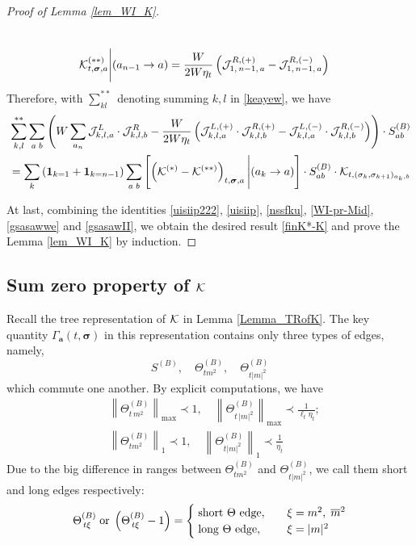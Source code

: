 \documentclass[10pt,reqno]{article}
\theoremstyle{plain} %
\theoremstyle{remark}
\numberwithin{equation}{section}
\begin{document}
\begin{proof}[Proof of Lemma \ref{lem_WI_K}]
\begin{itemize}
\begin{align}
      \\\nonumber
       {\cal K}^{(**)}_{t, \boldsymbol{\sigma}, \textbf{a}}\Bigg|(a_{n-1}\to a) 
      & = \frac{W}{2W\eta_t}
      \left({\cal J}^{R, (+)}_{1,\,n-1,\,a}-{\cal J}^{R, (-)}_{1,\,n-1,\,a}\right)
  \end{align}
  Therefore, with $\sum_{kl}^{**}$ denoting  summing  $k,l$ in \eqref{keayew}, we have  
  \begin{align}\label{uisiip222}
    &\sum_{k,l}^{**}  \sum_{a\;b}
    \left( {W}\sum_{a_n} 
        {\cal J}^{L}_{k,l,a}\cdot{\cal J}^{R}_{k,l,b}
        -\frac{W}{2W\eta_t} 
        \left(
        {\cal J}^{L,(+)}_{k,l,a}\cdot{\cal J}^{R,(+)}_{k,l,b}
        -
        {\cal J}^{L,(-)}_{k,l,a}\cdot{\cal J}^{R,(-)}_{k,l,b}
        \right)
        \right)\cdot S^{(B)}_{ab} 
        \\\nonumber
       &=\sum_{k}\left({\bf 1}_{k=1}+{\bf 1}_{k=n-1}\right) \sum_{a\;b}
        \left[\left({\cal K}^{(*)}-{\cal K}^{(**)}\right)_{t, \boldsymbol{\sigma}, \textbf{a}}\Bigg|(a_k\to a)\right]
        \cdot S^{(B)}_{ab}\cdot  {\cal K}_{t, ( \sigma _k,  \sigma _{k+1})_{a_k,b}}
 \end{align}
 
\end{itemize}
At last,  combining  the identities \eqref{uisiip222}, \eqref{uisiip}, \eqref{nssfku}, \eqref{WI-pr-Mid}, \eqref{gsasawwe} and \eqref{gsasawII}, we obtain  the desired result  \eqref{finK*-K} and prove the Lemma \ref{lem_WI_K} by induction. 
\end{proof}


\bigskip


 
\subsection{Sum zero property of \texorpdfstring{$\cal K$}{K}}
Recall the tree representation of  $\cal K$ in  Lemma \ref{Lemma_TRofK}. 
The key quantity $\Gamma_{ \textbf{a}}(t, \boldsymbol{\sigma})$ in this representation contains only three types of edges, namely,  %
$$
S^{(B)},\quad \Theta^{(B)}_{tm^2}, \quad \Theta^{(B)}_{t|m|^2}
$$
which  commute one another. By explicit computations, we have 
 \begin{align}
     & \left\|\Theta^{(B)}_{t\,m^2}\right\|_{\max} \prec 1, \quad \left\|\Theta^{(B)}_{t\,|m|^2}\right\|_{\max}\prec \frac{1}{\ell_t\eta_t}; \\
   & \left\|\Theta^{(B)}_{tm^2}\right\|_{1} \prec 1, \quad \left\|\Theta^{(B)}_{t|m|^2}\right\|_1\prec \frac{1}{\eta_t}
 \end{align}
Due to the big difference in ranges  between $\Theta^{(B)}_{tm^2}$ and $\Theta^{(B)}_{t|m|^2}$, we  call them short and long edges respectively:
$$
\Theta^{(B)}_{\,t\xi} \; \hbox{or} \; \left(\Theta^{(B)}_{\,t\xi}-1\right)=\begin{cases}
   \;  \hbox{short $\Theta$ edge}, \quad &\xi=m^2, \; \overline m^2
     \\
     \;\hbox{long $\Theta$ edge}, \quad &\xi=|m|^2 
\end{cases}
$$
\end{document}
